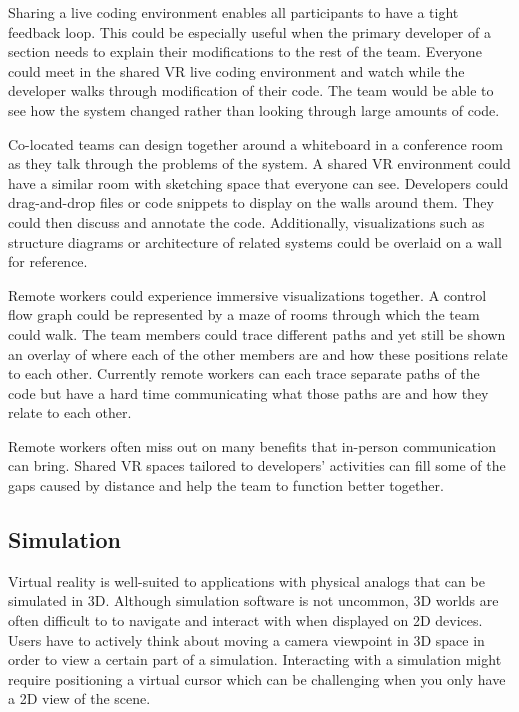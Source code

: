 \documentclass[conference]{IEEEtran}
\begin{document}
Sharing a live coding environment enables all participants to have a tight feedback loop. 
This could be especially useful when the primary developer of a section needs to explain their modifications to the rest of the team. 
Everyone could meet in the shared VR live coding environment and watch while the developer walks through modification of their code. 
The team would be able to see how the system changed rather than looking through large amounts of code.

Co-located teams can design together around a whiteboard in a conference room as they talk through the problems of the system. 
A shared VR environment could have a similar room with sketching space that everyone can see. 
Developers could drag-and-drop files or code snippets to display on the walls around them. 
They could then discuss and annotate the code. 
Additionally, visualizations such as structure diagrams or architecture of related systems could be overlaid on a wall for reference.

Remote workers could experience immersive visualizations together. 
A control flow graph could be represented by a maze of rooms through which the team could walk. 
The team members could trace different paths and yet still be shown an overlay of where each of the other members are and how these positions relate to each other. 
Currently remote workers can each trace separate paths of the code but have a hard time communicating what those paths are and how they relate to each other.

Remote workers often miss out on many benefits that in-person communication can bring. 
Shared VR spaces tailored to developers' activities can fill some of the gaps caused by distance and help the team to function better together. 

\subsection{Simulation}
Virtual reality is well-suited to applications with physical analogs that can be simulated in 3D. 
Although simulation software is not uncommon, 3D worlds are often difficult to to navigate and interact with when displayed on 2D devices. 
Users have to actively think about moving a camera viewpoint in 3D space in order to view a certain part of a simulation. 
Interacting with a simulation might require positioning a virtual cursor which can be challenging when you only have a 2D view of the scene. 
\end{document}
